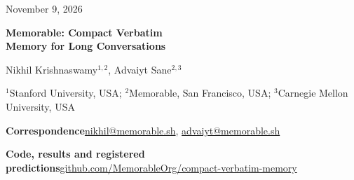 \documentclass[10pt]{article}
\newcommand{\hairline}{\par\noindent{\color{rule}\rule{\textwidth}{0.4pt}}\par}
\begin{document}
\thispagestyle{plain}
\begin{flushright}\sffamily\small\color{grey}November 9, 2026\end{flushright}
\hairline
\vspace{14pt}
{\noindent\fontsize{24}{29}\selectfont\bfseries\color{ink} Memorable: Compact Verbatim\\Memory for Long Conversations\par}
\vspace{12pt}
{\noindent\large Nikhil Krishnaswamy$^{1,2}$, Advaiyt Sane$^{2,3}$\par}
\vspace{4pt}
{\noindent\sffamily\footnotesize\color{grey}$^{1}$Stanford University, USA; $^{2}$Memorable, San Francisco, USA; $^{3}$Carnegie Mellon University, USA\par}
\vspace{8pt}
{\noindent\sffamily\footnotesize\textbf{Correspondence}\hspace{0.45em}\href{mailto:nikhil@memorable.sh}{nikhil@memorable.sh}, \href{mailto:advaiyt@memorable.sh}{advaiyt@memorable.sh}\par}
{\noindent\sffamily\footnotesize\textbf{Code, results and registered predictions}\hspace{0.45em}\href{https://github.com/MemorableOrg/compact-verbatim-memory}{github.com/MemorableOrg/compact-verbatim-memory}\par}
\vspace{10pt}
\hairline
\vspace{10pt}








\renewcommand{\bibfont}{\small\raggedright}

\appendix

\end{document}
